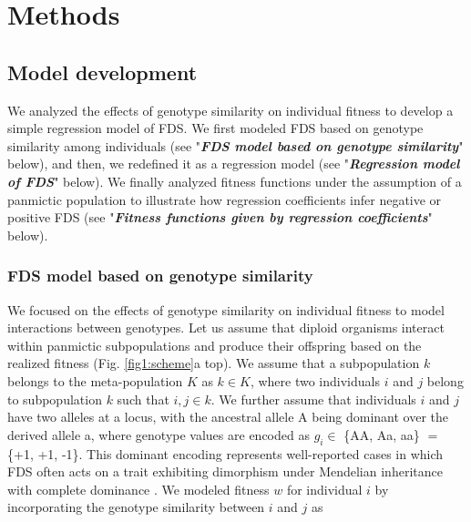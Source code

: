 \documentclass[12pt,]{article}
\begin{document}
\section{Methods}

\subsection{Model development}
We analyzed the effects of genotype similarity on individual fitness to develop a simple regression model of FDS. We first modeled FDS based on genotype similarity among individuals (see "\textit{\textbf{FDS model based on genotype similarity}}" below), and then, we redefined it as a regression model (see "\textit{\textbf{Regression model of FDS}}" below). We finally analyzed fitness functions under the assumption of a panmictic population to illustrate how regression coefficients infer negative or positive FDS (see "\textit{\textbf{Fitness functions given by regression coefficients}}" below).

\subsubsection{FDS model based on genotype similarity}
We focused on the effects of genotype similarity on individual fitness to model interactions between genotypes. Let us assume that diploid organisms interact within panmictic subpopulations and produce their offspring based on the realized fitness (Fig. \ref{fig1:scheme}a top). We assume that a subpopulation $k$ belongs to the meta-population $K$ as $k \in K$, where two individuals $i$ and $j$ belong to subpopulation $k$ such that $i,j \in k$. We further assume that individuals $i$ and $j$ have two alleles at a locus, with the ancestral allele A being dominant over the derived allele a, where genotype values are encoded as $g_i \in$ \{AA, Aa, aa\} $=$ \{+1, +1, -1\}. This dominant encoding represents well-reported cases in which FDS often acts on a trait exhibiting dimorphism under Mendelian inheritance with complete dominance \citep[e.g.,][]{takahashi2010negative,sato2017herbivore}. We modeled fitness $w$ for individual $i$ by incorporating the genotype similarity between $i$ and $j$ as 
\end{document}
